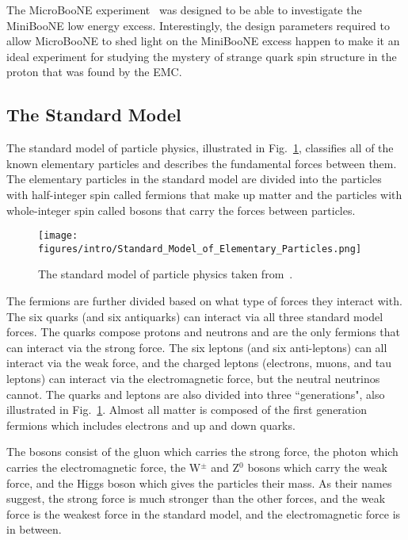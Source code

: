 The MicroBooNE experiment~\cite{Acciarri:2016smi} was designed to be able to
investigate the MiniBooNE low energy excess. Interestingly, the design
parameters required to allow MicroBooNE to shed light on the MiniBooNE excess
happen to make it an ideal experiment for studying the mystery of strange quark
spin structure in the proton that was found by the EMC.


\subsection{The Standard Model}\label{sec:standardmodel}

The standard model of particle physics, illustrated in
Fig.~\ref{fig:standardmodel}, classifies all of the known elementary particles
and describes the fundamental forces between them. The elementary particles in
the standard model are divided into the particles with half-integer spin called
fermions that make up matter and the particles with whole-integer spin called
bosons that carry the forces between particles.
\begin{figure}
  \centering
  \texttt{[image: figures/intro/Standard\_Model\_of\_Elementary\_Particles.png]}
  \caption{The standard model of particle physics taken from~\cite{MissMJ}.}
  \label{fig:standardmodel}
\end{figure}

The fermions are further divided based on what type of forces they interact
with.  The six quarks (and six antiquarks) can interact via all three standard
model forces. The quarks compose protons and neutrons and are the only fermions
that can interact via the strong force. The six leptons (and six anti-leptons)
can all interact via the weak force, and the charged leptons (electrons, muons,
and tau leptons) can interact via the electromagnetic force, but the neutral
neutrinos cannot. The quarks and leptons are also divided into three
``generations", also illustrated in Fig.~\ref{fig:standardmodel}. Almost all
matter is composed of the first generation fermions which includes electrons
and up and down quarks.

The bosons consist of the gluon which carries the strong force, the photon
which carries the electromagnetic force, the W$^{\pm}$ and Z$^0$ bosons which
carry the weak force, and the Higgs boson which gives the particles their mass.
As their names suggest, the strong force is much stronger than the other
forces, and the weak force is the weakest force in the standard model, and the
electromagnetic force is in between.

